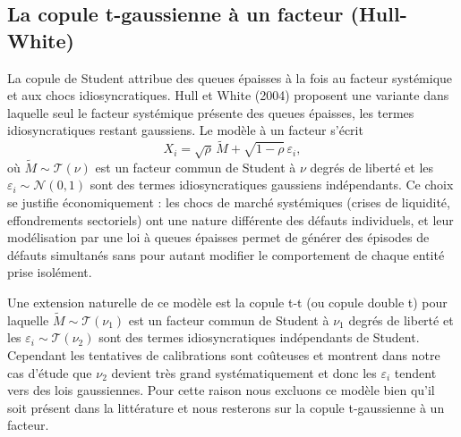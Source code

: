 \subsection{La copule t-gaussienne à un facteur (Hull-White)}

La copule de Student attribue des queues épaisses à la fois au facteur systémique et aux
chocs idiosyncratiques. Hull et White (2004) proposent une variante dans laquelle seul le
facteur systémique présente des queues épaisses, les termes idiosyncratiques restant gaussiens.
Le modèle à un facteur s'écrit
\begin{equation}
    X_i = \sqrt{\rho}\, \tilde{M} + \sqrt{1-\rho}\, \varepsilon_i,
\end{equation}
où $\tilde{M} \sim \mathcal{T}(\nu)$ est un facteur commun de Student à $\nu$ degrés de liberté et les
$\varepsilon_i \sim \mathcal{N}(0,1)$ sont des termes idiosyncratiques gaussiens indépendants.
Ce choix se justifie économiquement : les chocs de marché systémiques (crises de liquidité,
effondrements sectoriels) ont une nature différente des défauts individuels, et leur modélisation
par une loi à queues épaisses permet de générer des épisodes de défauts simultanés sans pour
autant modifier le comportement de chaque entité prise isolément. 

Une extension naturelle de ce modèle est la copule t-t (ou copule double t) pour laquelle
$\tilde{M} \sim \mathcal{T}(\nu_1)$ est un facteur commun de Student à $\nu_1$ degrés de liberté 
et les $\varepsilon_i \sim \mathcal{T}(\nu_2)$ sont des termes idiosyncratiques indépendants de Student.
Cependant les tentatives de calibrations sont coûteuses et montrent dans notre cas d'étude que $\nu_2$
devient très grand systématiquement et donc les $\varepsilon_i$ tendent vers des lois gaussiennes.
Pour cette raison nous excluons ce modèle bien qu'il soit présent dans la littérature et nous
resterons sur la copule t-gaussienne à un facteur.

